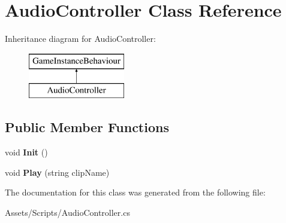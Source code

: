 \hypertarget{class_audio_controller}{}\section{Audio\+Controller Class Reference}
\label{class_audio_controller}
Inheritance diagram for Audio\+Controller\+:\begin{figure}[H]
\begin{center}
\leavevmode
\includegraphics[height=2.000000cm]{class_audio_controller}
\end{center}
\end{figure}
\subsection*{Public Member Functions}
\begin{DoxyCompactItemize}
\item 
void {\bfseries Init} ()\hypertarget{class_audio_controller_aa1241bc01d3057b8ba1fa691d36dd933}{}\label{class_audio_controller_aa1241bc01d3057b8ba1fa691d36dd933}

\item 
void {\bfseries Play} (string clip\+Name)\hypertarget{class_audio_controller_aef70629e0f437c0b9e2113146f17e456}{}\label{class_audio_controller_aef70629e0f437c0b9e2113146f17e456}

\end{DoxyCompactItemize}


The documentation for this class was generated from the following file\+:\begin{DoxyCompactItemize}
\item 
Assets/\+Scripts/Audio\+Controller.\+cs\end{DoxyCompactItemize}
